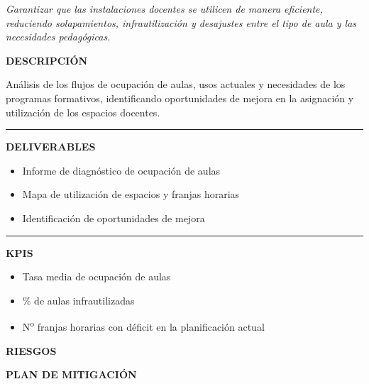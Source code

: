 \documentclass[11pt,a4paper]{scrreprt}
\newcommand{\fieldlabel}[1]{%
  {\footnotesize\sffamily\bfseries\color{mutedcolor}\MakeUppercase{#1}}\par\nopagebreak[4]
}
\newcommand{\fieldsep}{\vspace{3pt}\noindent\textcolor{bordercolor}{\rule{\linewidth}{0.4pt}}\vspace{3pt}\par}
\begin{document}
\newpage
{}
{\small\color{mutedcolor}\itshape Garantizar que las instalaciones docentes se utilicen de manera eficiente, reduciendo solapamientos, infrautilización y desajustes entre el tipo de aula y las necesidades pedagógicas.}\par\vspace{6pt}

\begin{tcolorbox}[pabox={espcolor}{PA4.1 \enspace\textbullet\enspace Diagnóstico y análisis del uso de espacios y horarios}]

\fieldlabel{Descripci\'on}
{\small Análisis de los flujos de ocupación de aulas, usos actuales y necesidades de los programas formativos, identificando oportunidades de mejora en la asignación y utilización de los espacios docentes.}\par
\fieldsep
\fieldlabel{Deliverables}
{\small \begin{itemize}[noitemsep,topsep=2pt]
\item Informe de diagnóstico de ocupación de aulas
\item Mapa de utilización de espacios y franjas horarias
\item Identificación de oportunidades de mejora
\end{itemize}}\par
\fieldsep
\fieldlabel{KPIs}
{\small \begin{itemize}[noitemsep,topsep=2pt]
\item Tasa media de ocupación de aulas
\item \% de aulas infrautilizadas
\item N\textsuperscript{o} franjas horarias con déficit en la planificación actual
\end{itemize}}\par
\end{tcolorbox}
\begin{tcolorbox}[riskbox]
{\footnotesize\sffamily\bfseries\color{red!50!black} RIESGOS}\par{}
\end{tcolorbox}
\begin{tcolorbox}[mitbox]
{\footnotesize\sffamily\bfseries\color{green!40!black} PLAN DE MITIGACI\'ON}\par{}
\end{tcolorbox}
\vspace{8pt}
\end{document}
